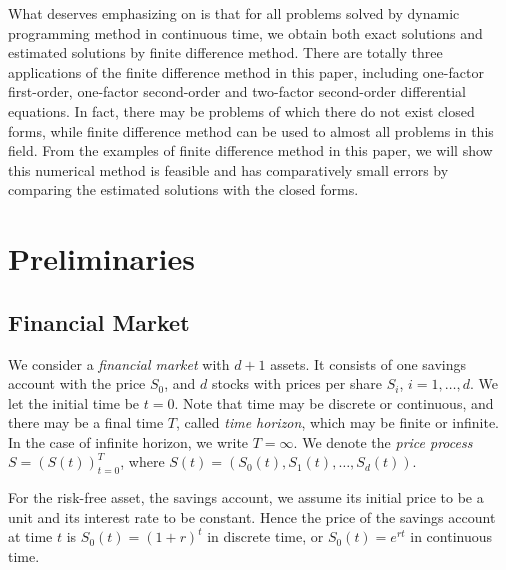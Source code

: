 \documentclass[a4paper]{article}
\theoremstyle{definition}
\numberwithin{equation}{section}
\begin{document}
What deserves emphasizing on is that for all problems solved by dynamic programming method in continuous time, we obtain both exact solutions and estimated solutions by finite difference method. There are totally three applications of the finite difference method in this paper, including one-factor first-order, one-factor second-order and two-factor second-order differential equations. In fact, there may be problems of which there do not exist closed forms, while finite difference method can be used to almost all problems in this field. From the examples of finite difference method in this paper, we will show this numerical method is feasible and has comparatively small errors by comparing the estimated solutions with the closed forms.

\section{Preliminaries}\label{ch:pre}

\subsection{Financial Market}
We consider a \emph{financial market} with $d+1$ assets. It consists of one savings account with the price $S_0$, and $d$ stocks with prices per share $S_i$, $i=1,\dots,d$. We let the initial time be $t=0$. Note that time may be discrete or continuous, and there may be a final time $T$, called \emph{time horizon}, which may be finite or infinite. In the case of infinite horizon, we write $T=\infty$. We denote the \emph{price process} $S=(S(t))^T_{t=0}$, where $S(t)=(S_0(t),S_1(t),\dots,S_d(t))$.

For the risk-free asset, the savings account, we assume its initial price to be a unit and its interest rate to be constant. Hence the price of the savings account at time $t$ is $S_0(t)=(1+r)^t$ in discrete time, or $S_0(t)=e^{rt}$ in continuous time.
\end{document}
